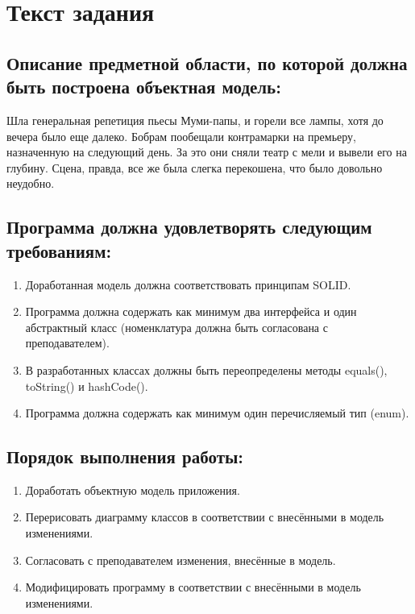 \documentclass{article}
\begin{document}
\itmo[
  variant=15677557,
  labn=3,
  discipline=Программирование,
  group=P3115,
  student=Владимир Мацюк,
  teacher=Сорокин Роман Борисович
]

\tableofcontents

\section{Текст задания}
\subsection{Описание предметной области, по которой должна быть построена объектная модель:}

Шла генеральная репетиция пьесы Муми-папы, и горели все лампы, хотя до вечера было еще далеко. Бобрам пообещали контрамарки на премьеру, назначенную на следующий день. За это они сняли театр с мели и вывели его на глубину. Сцена, правда, все же была слегка перекошена, что было довольно неудобно.
\subsection{Программа должна удовлетворять следующим требованиям:}
\begin{enumerate}
  \item Доработанная модель должна соответствовать принципам SOLID.
  \item Программа должна содержать как минимум два интерфейса и один абстрактный класс (номенклатура должна быть согласована с преподавателем).
  \item В разработанных классах должны быть переопределены методы equals(), toString() и hashCode().
  \item Программа должна содержать как минимум один перечисляемый тип (enum).
\end{enumerate}
\subsection{Порядок выполнения работы:}
\begin{enumerate}
  \item Доработать объектную модель приложения.
  \item Перерисовать диаграмму классов в соответствии с внесёнными в модель изменениями.
  \item Согласовать с преподавателем изменения, внесённые в модель.
  \item Модифицировать программу в соответствии с внесёнными в модель изменениями.
\end{enumerate}
\end{document}
